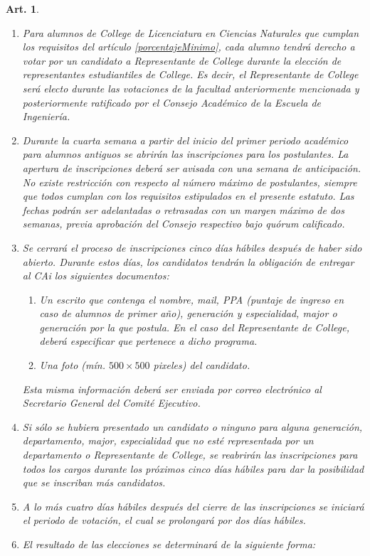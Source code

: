 \documentclass[letterpaper,11pt]{article}
\theoremstyle{plain}
\newtheorem{art}{Art.} %
\begin{document}
\begin{art}
\begin{enumerate}
				\item Para alumnos de College de Licenciatura en Ciencias Naturales que cumplan los requisitos del artículo \ref{porcentajeMinimo}, cada alumno tendrá derecho a votar por un candidato a Representante de College durante la elección de representantes estudiantiles de College. Es decir, el Representante de College será electo durante las votaciones de la facultad anteriormente mencionada y posteriormente ratificado por el Consejo Académico de la Escuela de Ingeniería.
				\item Durante la cuarta semana a partir del inicio del primer periodo académico para alumnos antiguos se abrirán las inscripciones para los postulantes. La apertura de inscripciones deberá ser avisada con una semana de anticipación. No existe restricción con respecto al número máximo de postulantes, siempre que todos cumplan con los requisitos estipulados en el presente estatuto. Las fechas podrán ser adelantadas o retrasadas con un margen máximo de dos semanas, previa aprobación del Consejo respectivo bajo quórum calificado.
				\item Se cerrará el proceso de inscripciones cinco días hábiles después de haber sido abierto. Durante estos días, los candidatos tendrán la obligación de entregar al CAi los siguientes documentos:
					\begin{enumerate}
						\item Un escrito que contenga el nombre, mail, PPA (puntaje de ingreso en caso de alumnos de primer año), generación y especialidad, major o generación por la que postula.  En el caso del Representante de College, deberá especificar que pertenece a dicho programa.
						\item Una foto (mín. $500 \times 500$ pixeles) del candidato.
					\end{enumerate}
				Esta misma información deberá ser enviada por correo electrónico al Secretario General del Comité Ejecutivo.
				\item Si sólo se hubiera presentado un candidato o ninguno para alguna generación, departamento, major, especialidad que no esté representada por un departamento o Representante de College, se reabrirán las inscripciones para todos los cargos durante los próximos cinco días hábiles para dar la posibilidad que se inscriban más candidatos.
				\item A lo más cuatro días hábiles después del cierre de las inscripciones se iniciará el periodo de votación, el cual se prolongará por dos días hábiles.
				\item El resultado de las elecciones se determinará de la siguiente forma:

\end{enumerate}
\end{art}
\end{document}
